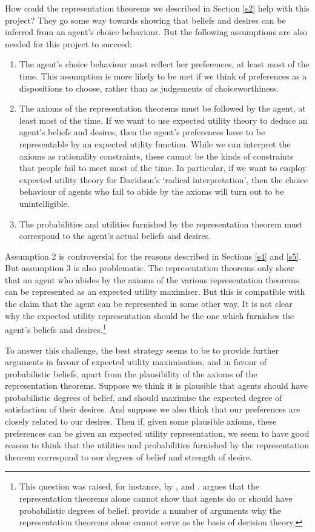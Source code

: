 How could the representation theorems we described in Section \ref{s2} help with this project? They go some way towards showing that beliefs and desires can be inferred from an agent's choice behaviour. But the following assumptions are also needed for this project to succeed:
\begin{enumerate}
\item The agent's choice behaviour must reflect her preferences, at least most of the time. This assumption is more likely to be met if we think of preferences as a dispositions to choose, rather than as judgements of choiceworthiness.
\item The axioms of the representation theorems must be followed by the agent, at least most of the time. If we want to use expected utility theory to deduce an agent's beliefs and desires, then the agent's preferences have to be representable by an expected utility function. While we can interpret the axioms as rationality constraints, these cannot be the kinds of constraints that people fail to meet most of the time. In particular, if we want to employ expected utility theory for Davidson's `radical interpretation', then the choice behaviour of agents who fail to abide by the axioms will turn out to be unintelligible.
\item The probabilities and utilities furnished by the representation theorem must correspond to the agent's actual beliefs and desires.
\end{enumerate}

Assumption 2 is controversial for the reasons described in Sections \ref{s4} and \ref{s5}. But assumption 3 is also problematic. The representation theorems only show that an agent who abides by the axioms of the various representation theorems can be represented as an expected utility maximiser. But this is compatible with the claim that the agent can be represented in some other way. It is not clear why the expected utility representation should be the one which furnishes the agent's beliefs and desires.\footnote{This question was raised, for instance, by \citet{Zynda2000}, \citet{Hajek2008} and \citet{MeachamWeisberg2011}. \citet{Zynda2000} argues that the representation theorems alone cannot show that agents do or should have probabilistic degrees of belief. \citet{MeachamWeisberg2011} provide a number of arguments why the representation theorems alone cannot serve as the basis of decision theory.}

To answer this challenge, the best strategy seems to be to provide further arguments in favour of expected utility maximisation, and in favour of probabilistic beliefs, apart from the plausibility of the axioms of the representation theorems. Suppose we think it is plausible that agents should have probabilistic degrees of belief, and should maximise the expected degree of satisfaction of their desires. And suppose we also think that our preferences are closely related to our desires. Then if, given some plausible axioms, these preferences can be given an expected utility representation, we seem to have good reason to think that the utilities and probabilities furnished by the representation theorem correspond to our degrees of belief and strength of desire.

